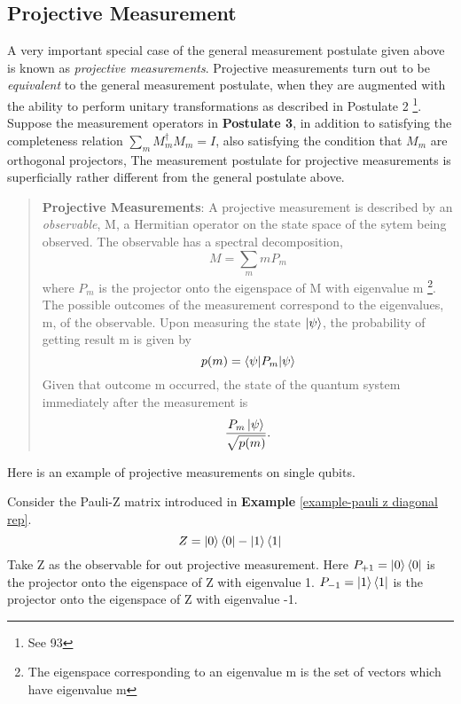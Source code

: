 {\subsection{Projective Measurement}\label{subsection:projective measurement}
A very important special case of the general measurement postulate given above is known as \textit{projective measurements}. Projective measurements turn out to be \textit{equivalent} to the general measurement postulate, when they are augmented with the ability to perform unitary transformations as described in Postulate 2 \footnote{See \cite{Wehner:notes} 93}. 
Suppose the measurement operators in \textbf{Postulate 3}, in addition to satisfying the completeness relation  $\sum_m M_m^\dagger M_m =I$, also satisfying the condition that $M_m$ are orthogonal projectors, 
The measurement postulate for projective measurements is superficially rather different from the general postulate above.
\begin{quote}
    \textbf{Projective Measurements}: A projective measurement is described by an \textit{observable}, M, a Hermitian operator on the state space of the sytem being observed. The observable has a spectral decomposition,
    \begin{equation}
        M=\sum_m m P_m
    \end{equation}
    where $P_m$ is the projector onto the eigenspace of M with eigenvalue m \footnote{The eigenspace corresponding to an eigenvalue m is the set of vectors which have eigenvalue m}. The possible outcomes of the measurement correspond to the eigenvalues, m, of the observable. Upon measuring the state $\ket{\psi}$, the probability of getting result m is given by 
    \begin{equation}
        p(m)=\braket{\psi|P_m|\psi}
    \end{equation}
    Given that outcome m occurred, the state of the quantum system immediately after the measurement is 
    \begin{equation}
        \frac{P_m \ket{\psi}}{\sqrt{p(m)}}.
    \end{equation}
\end{quote}

Here is an example of projective measurements on single qubits.
\begin{example}
Consider the Pauli-Z matrix introduced in \textbf{Example} \ref{example-pauli z diagonal rep}.
\begin{equation}
    Z=\ket{0}\bra{0}-\ket{1}\bra{1}
\end{equation}
Take Z as the observable for out projective measurement. Here $P_{+1}=\ket{0}\bra{0}$ is the projector onto the eigenspace of Z with eigenvalue 1. $P_{-1}=\ket{1}\bra{1}$ is the projector onto the eigenspace of Z with eigenvalue -1.


\end{example}}
